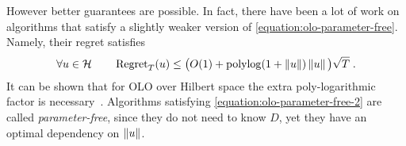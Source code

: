 However better guarantees are possible. In fact, there have been a lot of work on algorithms \citep{Streeter-McMahan-2012,
Orabona-2013, McMahan-Abernethy-2013,
McMahan-Orabona-2014,Orabona-2014} that satisfy a slightly
weaker version of \eqref{equation:olo-parameter-free}. Namely, their regret satisfies
\begin{equation}
\label{equation:olo-parameter-free-2}
\forall u \in \mathcal{H} \qquad \operatorname{Regret}_T(u) \le \big(O(1)+\operatorname{polylog}(1 + \left\|{u}\right\|)\left\|{u}\right\| \big) \sqrt{T} \; .
\end{equation}
It can be shown that for \ac{OLO} over Hilbert space the extra poly-logarithmic
factor is necessary~\citep{McMahan-Abernethy-2013,Orabona-2013}. Algorithms
satisfying \eqref{equation:olo-parameter-free-2} are called
\emph{parameter-free}, since they do not need to know $D$, yet they have an
optimal dependency on $\left\|{u}\right\|$.

